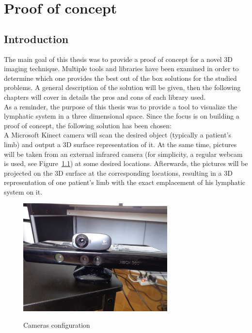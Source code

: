 \chapter[Proof of concept]{Proof of concept}
\section{Introduction}
\label{sec:proof of concept - introduction}
The main goal of this thesis was to provide a proof of concept for a novel 3D imaging technique. Multiple tools and libraries have been examined in order to determine which one provides the best out of the box solutions for the studied problems. A general description of the solution will be given, then the following chapters will cover in details the pros and cons of each library used.
\\

As a reminder, the purpose of this thesis was to provide a tool to visualize the lymphatic system in a three dimensional space. Since the focus is on building a proof of concept, the following solution has been chosen:
\\

A Microsoft Kinect camera will scan the desired object (typically a patient's limb) and output a 3D surface representation of it. At the same time, pictures will be taken from an external infrared camera (for simplicity, a regular webcam is used, see Figure~\ref{fig:configuration}) at some desired locations. Afterwards, the pictures will be projected on the 3D surface at the corresponding locations, resulting in a 3D representation of one patient's limb with the exact emplacement of his lymphatic system on it.\\

\begin{figure}
\caption{Cameras configuration}
\centering
    \includegraphics[width=0.7\textwidth]{images/configuration.jpg}
\label{fig:configuration}
\end{figure}


